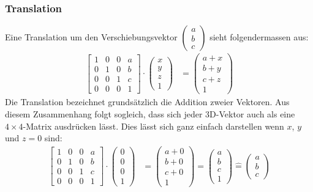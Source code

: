 \documentclass[titlepage, 11pt, a4paper, ngerman]{article}
\begin{document}
\subsubsection{Translation}
Eine Translation um den Verschiebungsvektor $\begin{pmatrix}
    a \\
    b \\
    c
    \end{pmatrix}$ sieht folgendermassen aus:
\begin{align*}
    \begin{bmatrix} 
    1 & 0 & 0 & a \\
    0 & 1 & 0 & b \\
    0 & 0 & 1 & c \\
    0 & 0 & 0 & 1
    \end{bmatrix} \cdot
    \begin{pmatrix}
    x \\ y \\ z \\ 1
    \end{pmatrix} &= 
    \begin{pmatrix}
    a + x \\
    b + y \\
    c + z \\
    1
    \end{pmatrix}
\end{align*}
\bigbreak
Die Translation bezeichnet grundsätzlich die Addition zweier Vektoren. Aus diesem Zusammenhang folgt sogleich, dass sich jeder 3D-Vektor auch als eine $4\times4$-Matrix ausdrücken lässt. Dies lässt sich ganz einfach darstellen wenn $x$, $y$ und $z = 0$ sind:
\begin{align*}
    \begin{bmatrix}
    1 & 0 & 0 & a \\
    0 & 1 & 0 & b \\
    0 & 0 & 1 & c \\
    0 & 0 & 0 & 1
    \end{bmatrix} \cdot
    \begin{pmatrix}
    0 \\ 0 \\ 0 \\ 1
    \end{pmatrix} &=
    \begin{pmatrix}
    a + 0 \\
    b + 0 \\
    c + 0 \\
    1
    \end{pmatrix} = 
    \begin{pmatrix}
    a \\
    b \\
    c \\
    1
    \end{pmatrix} \widehat{=}
    \begin{pmatrix}
    a \\
    b \\
    c
    \end{pmatrix}
\end{align*}
\end{document}
